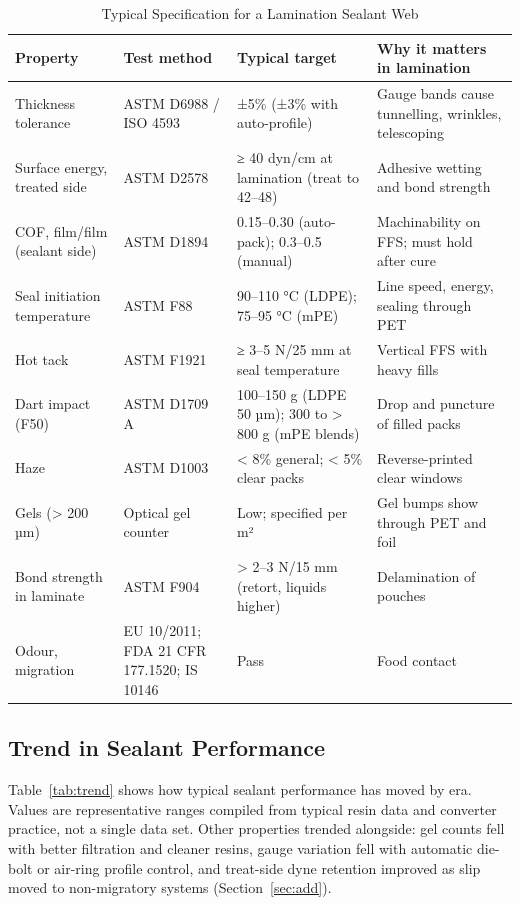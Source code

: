 \documentclass[10pt,twocolumn,a4paper]{article}
\begin{document}
\begin{table}[!t]
\caption{Typical Specification for a Lamination Sealant Web}
\label{tab:spec}
\footnotesize
\begin{tabularx}{\textwidth}{@{}p{40mm}p{40mm}p{55mm}L@{}}
\toprule
\textbf{Property} & \textbf{Test method} & \textbf{Typical target} & \textbf{Why it matters in lamination}\\
\midrule
Thickness tolerance & ASTM D6988 / ISO 4593 & ±5\% (±3\% with auto-profile) & Gauge bands cause tunnelling, wrinkles, telescoping\\
Surface energy, treated side & ASTM D2578 & ≥ 40 dyn/cm at lamination (treat to 42–48) & Adhesive wetting and bond strength\\
COF, film/film (sealant side) & ASTM D1894 & 0.15–0.30 (auto-pack); 0.3–0.5 (manual) & Machinability on FFS; must hold after cure\\
Seal initiation temperature & ASTM F88 & 90–110 °C (LDPE); 75–95 °C (mPE) & Line speed, energy, sealing through PET\\
Hot tack & ASTM F1921 & ≥ 3–5 N/25 mm at seal temperature & Vertical FFS with heavy fills\\
Dart impact (F50) & ASTM D1709 A & 100–150 g (LDPE 50 µm); 300 to > 800 g (mPE blends) & Drop and puncture of filled packs\\
Haze & ASTM D1003 & < 8\% general; < 5\% clear packs & Reverse-printed clear windows\\
Gels (> 200 µm) & Optical gel counter & Low; specified per m² & Gel bumps show through PET and foil\\
Bond strength in laminate & ASTM F904 & > 2–3 N/15 mm (retort, liquids higher) & Delamination of pouches\\
Odour, migration & EU 10/2011; FDA 21 CFR 177.1520; IS 10146 & Pass & Food contact\\
\bottomrule
\end{tabularx}
\end{table}

\subsection{Trend in Sealant Performance}

Table~\ref{tab:trend} shows how typical sealant performance has moved by era. Values are representative ranges compiled from typical resin data and converter practice, not a single data set. Other properties trended alongside: gel counts fell with better filtration and cleaner resins, gauge variation fell with automatic die-bolt or air-ring profile control, and treat-side dyne retention improved as slip moved to non-migratory systems (Section~\ref{sec:add}).
\end{document}
